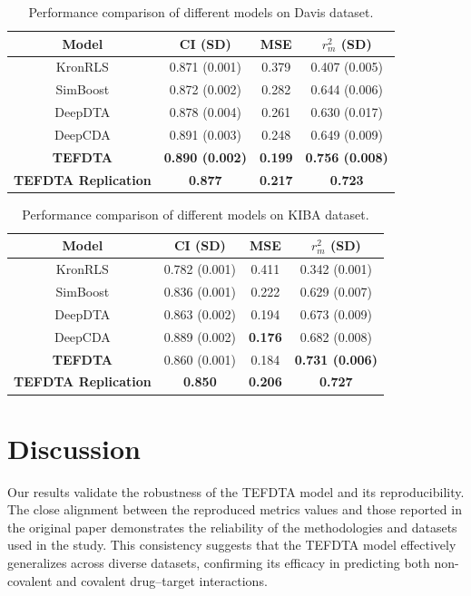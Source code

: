 \documentclass{article}
\begin{document}
\begin{table}[H]
	\centering
	\caption{Performance comparison of different models on Davis dataset.}
	\label{tab:comparison_davis}
	\begin{tabular}{cccc}
		\toprule
		\textbf{Model} & \textbf{CI (SD)} & \textbf{MSE} & \textbf{$r_m^2$ (SD)} \\
		\midrule
		KronRLS   & 0.871 (0.001) & 0.379 & 0.407 (0.005) \\
		SimBoost  & 0.872 (0.002) & 0.282 & 0.644 (0.006) \\
		DeepDTA   & 0.878 (0.004) & 0.261 & 0.630 (0.017) \\
		DeepCDA   & 0.891 (0.003) & 0.248 & 0.649 (0.009) \\
		\textbf{TEFDTA} & \textbf{0.890 (0.002)} & \textbf{0.199} & \textbf{0.756 (0.008)} \\
		\textbf{TEFDTA Replication} & \textbf{0.877} & \textbf{0.217} & \textbf{0.723} \\
		\bottomrule
	\end{tabular}
\end{table}

\begin{table}[H]
	\centering
	\caption{Performance comparison of different models on KIBA dataset.}
	\label{tab:comparison_kiba}
	\begin{tabular}{cccc}
		\toprule
		\textbf{Model} & \textbf{CI (SD)} & \textbf{MSE} & \textbf{$r_m^2$ (SD)} \\
		\midrule
		KronRLS   & 0.782 (0.001) & 0.411 & 0.342 (0.001) \\
		SimBoost  & 0.836 (0.001) & 0.222 & 0.629 (0.007) \\
		DeepDTA   & 0.863 (0.002) & 0.194 & 0.673 (0.009) \\
		DeepCDA   & 0.889 (0.002) & \textbf{0.176} & 0.682 (0.008) \\
		\textbf{TEFDTA} & 0.860 (0.001) & 0.184 & \textbf{0.731 (0.006)} \\
		\textbf{TEFDTA Replication} & \textbf{0.850} & \textbf{0.206} & \textbf{0.727} \\
		\bottomrule
	\end{tabular}
\end{table}



\section{Discussion}
Our results validate the robustness of the TEFDTA model and its reproducibility. The close alignment between the reproduced metrics values and those reported in the original paper demonstrates the reliability of the methodologies and datasets used in the study. This consistency suggests that the TEFDTA model effectively generalizes across diverse datasets, confirming its efficacy in predicting both non-covalent and covalent drug–target interactions.
\end{document}
